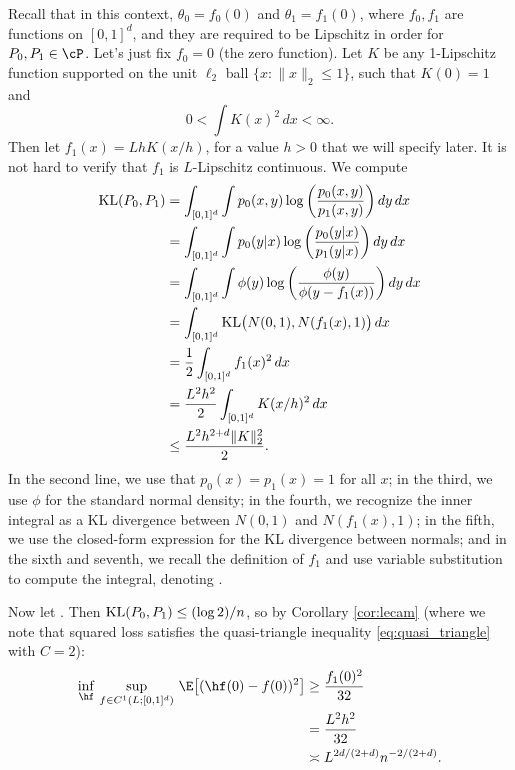 \documentclass{article}
\begin{document}
Recall that in this context, $\theta_0 = f_0(0)$ and $\theta_1 = f_1(0)$, where
$f_0,f_1$ are functions on $[0,1]^d$, and they are required to be Lipschitz in
order for $P_0,P_1 \in \cP$. Let's just fix $f_0 = 0$ (the zero function). Let 
$K$ be any 1-Lipschitz function supported on the unit $\ell_2$ ball $\{ x :
\|x\|_2 \leq 1 \}$, such that $K(0) = 1$ and     
\[
0 < \int K(x)^2 \, dx < \infty.
\]
Then let $f_1(x) = Lh K(x/h)$, for a value $h > 0$ that we will specify
later. It is not hard to verify that $f_1$ is $L$-Lipschitz continuous.   
We compute
\allowdisplaybreaks
\begin{align*}
\mathrm{KL}(P_0,P_1) 
&= \int_{[0,1]^d} \int p_0(x,y) \log \bigg( \frac{p_0(x,y)}{p_1(x,y)} \bigg) \,
  dy \, dx \\  
&= \int_{[0,1]^d} \int p_0(y|x) \log \bigg( \frac{p_0(y|x)}{p_1(y|x)} \bigg) \,
  dy \, dx \\ 
&= \int_{[0,1]^d} \int \phi(y) \log \bigg( \frac{\phi(y)}{\phi(y - f_1(x))}
  \bigg) \, dy \, dx \\
&= \int_{[0,1]^d} \mathrm{KL}\big( N(0,1), N(f_1(x), 1) \big) \, dx \\
&= \frac{1}{2} \int_{[0,1]^d} f_1(x)^2 \, dx \\
&= \frac{L^2 h^2}{2} \int_{[0,1]^d} K(x/h)^2 \, dx \\
&\leq \frac{L^2 h^{2+d} \|K\|_2^2}{2}.
\end{align*}
In the second line, we use that $p_0(x) = p_1(x) = 1$ for all $x$; in the third,
we use $\phi$ for the standard normal density; in the fourth, we recognize the
inner integral as a KL divergence between $N(0,1)$ and $N(f_1(x),1)$; in the
fifth, we use the closed-form expression for the KL divergence between normals; 
and in the sixth and seventh, we recall the definition of $f_1$ and use variable 
substitution to compute the integral, denoting .   

Now let . Then
$\mathrm{KL}(P_0,P_1) \leq (\log 2)/n$, so by Corollary \ref{cor:lecam} (where we note
that squared loss satisfies the quasi-triangle inequality
\eqref{eq:quasi_triangle} with $C=2$):     
\begin{align*}
\inf_{\hf} \, \sup_{f \in C^1(L; [0,1]^d)} \, \E\big[ (\hf(0) - f(0))^2 \big] 
&\geq \frac{f_1(0)^2}{32} \\ 
&= \frac{L^2 h^2}{32} \\
&\asymp L^{2d/(2+d)} n^{-2/(2+d)}. 
\end{align*}
\end{document}
